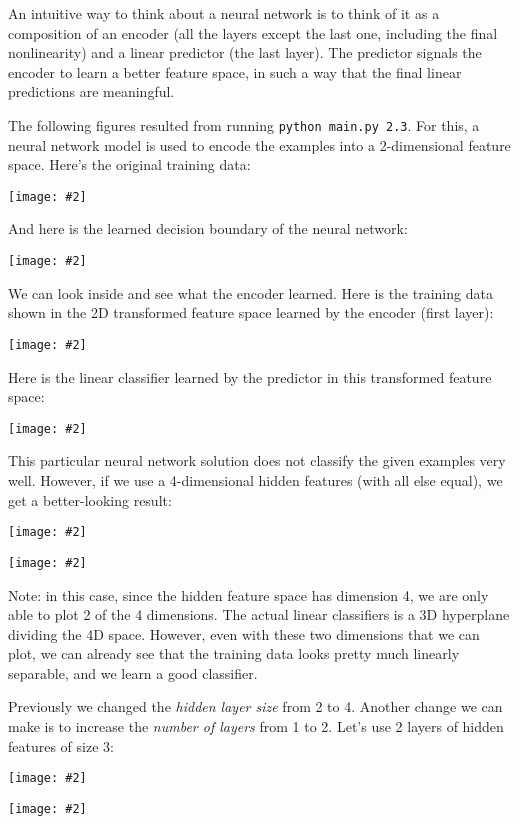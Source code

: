 \documentclass{article}
\newcommand{\centerfig}[2]{\begin{center}\texttt{[image: \#2]}\end{center}}
\begin{document}
An intuitive way to think about a neural network is to think of it as a composition of an encoder (all the layers except the last one, including the final nonlinearity) and a linear predictor (the last layer). The predictor signals the encoder to learn a better feature space, in such a way that the final linear predictions are meaningful.

The following figures resulted from running \texttt{python main.py 2.3}. For this, a neural network model is used to encode the examples into a 2-dimensional feature space. Here's the original training data:

\centerfig{.7}{./figs/sinusoids.png}

And here is the learned decision boundary of the neural network:

\centerfig{.7}{./figs/sinusoids_decision_boundary_[2]_2.png}

We can look inside and see what the encoder learned. Here is the training data shown in the 2D transformed feature space learned by the encoder (first layer):

\centerfig{.7}{./figs/sinusoids_learned_features_[2]_2.png}

Here is the linear classifier learned by the predictor in this transformed feature space:

\centerfig{.7}{./figs/sinusoids_linear_boundary_[2]_2.png}


This particular neural network solution does not classify the given examples very well. However, if we use a 4-dimensional hidden features (with all else equal), we get a better-looking result:

\centerfig{.7}{./figs/sinusoids_decision_boundary_[4]_2.png}
\centerfig{.7}{./figs/sinusoids_linear_boundary_[4]_2.png}

Note: in this case, since the hidden feature space has dimension 4, we are only able to plot 2 of the 4 dimensions. The actual linear classifiers is a 3D hyperplane dividing the 4D space. However, even with these two dimensions that we can plot, we can already see that the training data looks pretty much linearly separable, and we learn a good classifier.

Previously we changed the \emph{hidden layer size} from 2 to 4. Another change we can make is to increase the \emph{number of layers} from 1 to 2. Let's use 2 layers of hidden features of size 3:

\centerfig{.7}{./figs/sinusoids_decision_boundary_[3, 3]_2.png}
\centerfig{.7}{./figs/sinusoids_linear_boundary_[3, 3]_2.png}
\end{document}
